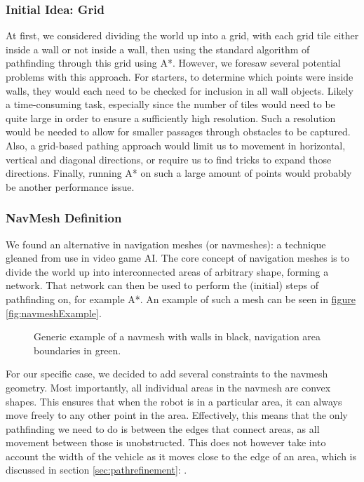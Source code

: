 \documentclass[10pt, abstracton, twocolumn]{scrartcl}
\newcommand{\fref}[1]{\hyperref[#1]{figure \vref{#1}}}
\newcommand{\sref}[1]{section \vref{#1}: \nameref{#1}}
\begin{document}
\subsubsection{Initial Idea: Grid}
At first, we considered dividing the world up into a grid, with each grid tile either inside a wall or not inside a wall, then using the standard algorithm of pathfinding through this grid using A*. However, we foresaw several potential problems with this approach. For starters, to determine which points were inside walls, they would each need to be checked for inclusion in all wall objects. Likely a time-consuming task, especially since the number of tiles would need to be quite large in order to ensure a sufficiently high resolution. Such a resolution would be needed to allow for smaller passages through obstacles to be captured. Also, a grid-based pathing approach would limit us to movement in horizontal, vertical and diagonal directions, or require us to find tricks to expand those directions. Finally, running A* on such a large amount of points would probably be another performance issue.

\subsubsection{NavMesh Definition}
We found an alternative in navigation meshes (or navmeshes): a technique gleaned from use in video game AI. The core concept of navigation meshes is to divide the world up into interconnected areas of arbitrary shape, forming a network. That network can then be used to perform the (initial) steps of pathfinding on, for example A*. An example of such a mesh can be seen in \fref{fig:navmeshExample}.

\begin{figure}
        \centering
        
        \caption{\small Generic example of a navmesh with walls in black, navigation area boundaries in green.}
        \label{fig:navmeshExample}
\end{figure}

For our specific case, we decided to add several constraints to the navmesh geometry. Most importantly, all individual areas in the navmesh  are convex shapes. This ensures that when the robot is in a particular area, it can always move freely to any other point in the area. Effectively, this means that the only pathfinding we need to do is between the edges that connect areas, as all movement between those is unobstructed. This does not however take into account the width of the vehicle as it moves close to the edge of an area, which is discussed in \sref{sec:pathrefinement}.
\end{document}
